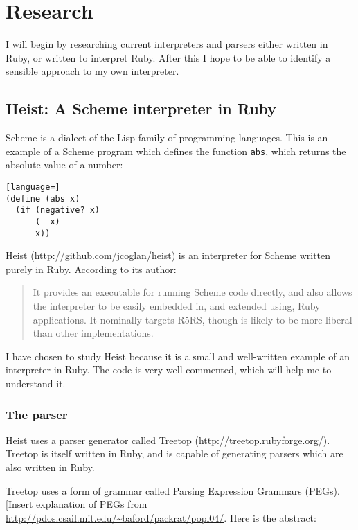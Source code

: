 \section{Research}

I will begin by researching current interpreters and parsers either written in Ruby, or written to interpret Ruby. After this I hope to be able to identify a sensible approach to my own interpreter.

\subsection{Heist: A Scheme interpreter in Ruby}

Scheme is a dialect of the Lisp family of programming languages. This is an example of a Scheme program which defines the function \texttt{abs}, which returns the absolute value of a number:

\begin{lstlisting}[language=]
(define (abs x)
  (if (negative? x)
      (- x)
      x))
\end{lstlisting}

Heist (\url{http://github.com/jcoglan/heist}) is an interpreter for Scheme written purely in Ruby. According to its author:

\begin{quote}
It provides an executable for running Scheme code directly, and also allows the interpreter to be easily embedded in, and extended using, Ruby applications. It nominally targets R5RS, though is likely to be more liberal than other implementations.
\end{quote}

I have chosen to study Heist because it is a small and well-written example of an interpreter in Ruby. The code is very well commented, which will help me to understand it.

\subsubsection{The parser}
\label{sec:heist-parser}

Heist uses a parser generator called Treetop (\url{http://treetop.rubyforge.org/}). Treetop is itself written in Ruby, and is capable of generating parsers which are also written in Ruby.

Treetop uses a form of grammar called Parsing Expression Grammars (\gls{PEG}s). [Insert explanation of PEGs from \url{http://pdos.csail.mit.edu/~baford/packrat/popl04/}. Here is the abstract:

